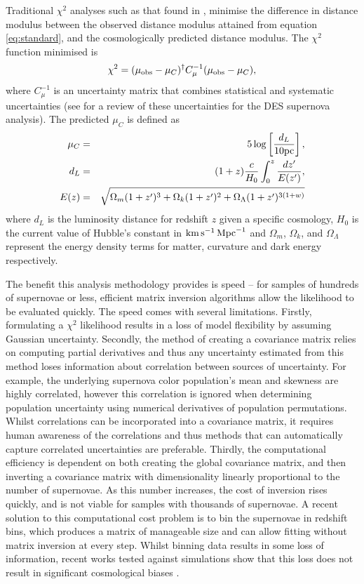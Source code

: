 \documentclass[a4paper,fleqn,usenatbib,manuscript]{emulateapj}
\newcommand{\kmsmpc}{{\rm km}\,{\rm s}^{-1}\,{\rm Mpc}^{-1}}
\begin{document}
Traditional $\chi^2$ analyses such as that found in \citet{Riess1998, Perlmutter1999, Wood-Vasey2007, Kowalski2008, Kessler2009, Conley2011, Betoule2014}, minimise the difference in distance modulus between the observed distance modulus attained from equation \ref{eq:standard}, and the cosmologically predicted distance modulus. The $\chi^2$ function minimised is
\begin{equation}
\chi^2 = (\mu_{\rm obs} - \mu_C)^\dagger C^{-1}_{\mu} (\mu_{\rm obs} - \mu_C),
\end{equation}
where $C^{-1}_{\mu}$ is an uncertainty matrix that combines statistical and systematic uncertainties (see \citet{Brout18SYS} for a review of these uncertainties for the DES supernova analysis). The predicted $\mu_C$ is defined as
\begin{eqnarray}
\mu_C &=& 5 \log\left[ \frac{d_L}{10{\rm pc}} \right], \label{eq:mu0}\\
d_L &=& (1+z)\frac{c}{H_0} \int_0^z \frac{dz'}{E(z')},\\
E(z) &=& \sqrt{ \Omega_m (1+z')^3 + \Omega_k (1 + z')^2 + \Omega_\Lambda (1+z')^{3(1+w)}}
\end{eqnarray}
where $d_L$ is the luminosity distance for redshift $z$ given a specific cosmology, $H_0$ is the current value of Hubble's constant in $\kmsmpc$ and $\Omega_m$, $\Omega_k$, and $\Omega_\Lambda$ represent the energy density terms for matter, curvature and dark energy respectively.

The benefit this analysis methodology provides is speed -- for samples of hundreds of supernovae or less, efficient matrix inversion algorithms allow the likelihood to be evaluated quickly. The speed comes with several limitations. Firstly, formulating a $\chi^2$ likelihood results in a loss of model flexibility by assuming Gaussian uncertainty. Secondly, the method of creating a covariance matrix relies on computing partial derivatives and thus any uncertainty estimated from this method loses information about correlation between sources of uncertainty. For example, the underlying supernova color population's mean and skewness are highly correlated, however this correlation is ignored when determining population uncertainty using numerical derivatives of population permutations. Whilst correlations can be incorporated into a covariance matrix, it requires human awareness of the correlations and thus methods that can automatically capture correlated uncertainties are preferable. Thirdly, the computational efficiency is dependent on both creating the global covariance matrix, and then inverting a covariance matrix with dimensionality linearly proportional to the number of supernovae. As this number increases, the cost of inversion rises quickly, and is not viable for samples with thousands of supernovae. A recent solution to this computational cost problem is to bin the supernovae in redshift bins, which produces a matrix of manageable size and can allow fitting without matrix inversion at every step. Whilst binning data results in some loss of information, recent works tested against simulations show that this loss does not result in significant cosmological biases \citep{Scolnic2016, Kessler2017}.
\end{document}
